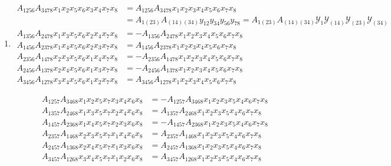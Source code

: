 \documentclass[aps, preprint]{revtex4}
\begin{document}
\begin{enumerate}
\item
\begin{align}A_{1 2 5 6} A_{3 4 7 8} x_{1} x_{2} x_{5} x_{6} x_{3} x_{4} x_{7} x_{8} &  =A_{1 2 5 6} A_{3 4 7 8} x_{1} x_{2} x_{3} x_{4} x_{5} x_{6} x_{7} x_{8} \\
 &  =A_{1 \left (23\right )} A_{\left (14\right ) \left (34\right )} y_{1 2} y_{3 4} y_{5 6} y_{7 8} =A_{1 \left (23\right )} A_{\left (14\right ) \left (34\right )} \mathcal{Y}_{1} \mathcal{Y}_{\left (14\right )} \mathcal{Y}_{\left (23\right )} \mathcal{Y}_{\left (34\right )} \\
A_{1 3 5 6} A_{2 4 7 8} x_{1} x_{3} x_{5} x_{6} x_{2} x_{4} x_{7} x_{8} &  = -A_{1 3 5 6} A_{2 4 7 8} x_{1} x_{2} x_{3} x_{4} x_{5} x_{6} x_{7} x_{8} \\
A_{1 4 5 6} A_{2 3 7 8} x_{1} x_{4} x_{5} x_{6} x_{2} x_{3} x_{7} x_{8} &  =A_{1 4 5 6} A_{2 3 7 8} x_{1} x_{2} x_{3} x_{4} x_{5} x_{6} x_{7} x_{8} \\
A_{2 3 5 6} A_{1 4 7 8} x_{2} x_{3} x_{5} x_{6} x_{1} x_{4} x_{7} x_{8} &  = -A_{2 3 5 6} A_{1 4 7 8} x_{1} x_{2} x_{3} x_{4} x_{5} x_{6} x_{7} x_{8} \\
A_{2 4 5 6} A_{1 3 7 8} x_{2} x_{4} x_{5} x_{6} x_{1} x_{3} x_{7} x_{8} &  = -A_{2 4 5 6} A_{1 3 7 8} x_{1} x_{2} x_{3} x_{4} x_{5} x_{6} x_{7} x_{8} \\
A_{3 4 5 6} A_{1 2 7 8} x_{3} x_{4} x_{5} x_{6} x_{1} x_{2} x_{7} x_{8} &  =A_{3 4 5 6} A_{1 2 7 8} x_{1} x_{2} x_{3} x_{4} x_{5} x_{6} x_{7} x_{8}\end{align}


\begin{align}A_{1 2 5 7} A_{3 4 6 8} x_{1} x_{2} x_{5} x_{7} x_{3} x_{4} x_{6} x_{8} &  = -A_{1 2 5 7} A_{3 4 6 8} x_{1} x_{2} x_{3} x_{5} x_{4} x_{6} x_{7} x_{8} \\
A_{1 3 5 7} A_{2 4 6 8} x_{1} x_{3} x_{5} x_{7} x_{2} x_{4} x_{6} x_{8} &  =A_{1 3 5 7} A_{2 4 6 8} x_{1} x_{2} x_{3} x_{5} x_{4} x_{6} x_{7} x_{8} \\
A_{1 4 5 7} A_{2 3 6 8} x_{1} x_{4} x_{5} x_{7} x_{2} x_{3} x_{6} x_{8} &  = -A_{1 4 5 7} A_{2 3 6 8} x_{1} x_{2} x_{3} x_{5} x_{4} x_{6} x_{7} x_{8} \\
A_{2 3 5 7} A_{1 4 6 8} x_{2} x_{3} x_{5} x_{7} x_{1} x_{4} x_{6} x_{8} &  =A_{2 3 5 7} A_{1 4 6 8} x_{1} x_{2} x_{3} x_{5} x_{4} x_{6} x_{7} x_{8} \\
A_{2 4 5 7} A_{1 3 6 8} x_{2} x_{4} x_{5} x_{7} x_{1} x_{3} x_{6} x_{8} &  =A_{2 4 5 7} A_{1 3 6 8} x_{1} x_{2} x_{3} x_{5} x_{4} x_{6} x_{7} x_{8} \\
A_{3 4 5 7} A_{1 2 6 8} x_{3} x_{4} x_{5} x_{7} x_{1} x_{2} x_{6} x_{8} &  =A_{3 4 5 7} A_{1 2 6 8} x_{1} x_{2} x_{3} x_{5} x_{4} x_{6} x_{7} x_{8}\end{align}



\end{enumerate}
\end{document}
